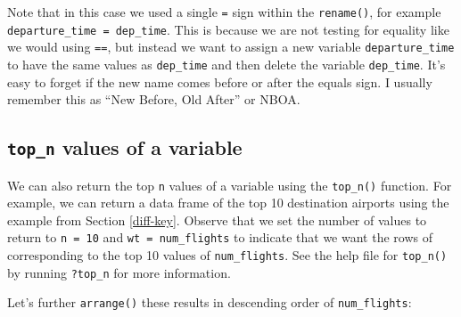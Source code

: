 \documentclass[12pt, krantz2,]{krantz}
\makeatletter
\newenvironment{Shaded}{\begin{snugshade}}{\end{snugshade}}
\newcommand{\DataTypeTok}[1]{\textcolor[rgb]{0.27,0.27,0.27}{#1}}
\newcommand{\DecValTok}[1]{\textcolor[rgb]{0.06,0.06,0.06}{#1}}
\newcommand{\KeywordTok}[1]{\textcolor[rgb]{0.27,0.27,0.27}{\textbf{#1}}}
\newcommand{\NormalTok}[1]{#1}
\newcommand{\OperatorTok}[1]{\textcolor[rgb]{0.43,0.43,0.43}{\textbf{#1}}}
\newcommand{\StringTok}[1]{\textcolor[rgb]{0.5,0.5,0.5}{#1}}
\newenvironment{kframe}{%
\medskip{}
\setlength{\fboxsep}{.8em}
 \def\at@end@of@kframe{}%
 \ifinner\ifhmode%
  \def\at@end@of@kframe{\end{minipage}}%
  \begin{minipage}{\columnwidth}%
 \fi\fi%
 \def\FrameCommand##1{\hskip\@totalleftmargin \hskip-\fboxsep
 \colorbox{shadecolor}{##1}\hskip-\fboxsep
     \hskip-\linewidth \hskip-\@totalleftmargin \hskip\columnwidth}%
 \MakeFramed {\advance\hsize-\width
   \@totalleftmargin\z@ \linewidth\hsize
   \@setminipage}}%
 {\par\unskip\endMakeFramed%
 \at@end@of@kframe}
\renewenvironment{Shaded}{\begin{kframe}}{\end{kframe}}
\makeatother
\begin{document}
Note that in this case we used a single \texttt{=} sign within the \texttt{rename()}, for example \texttt{departure\_time\ =\ dep\_time}. This is because we are not testing for equality like we would using \texttt{==}, but instead we want to assign a new variable \texttt{departure\_time} to have the same values as \texttt{dep\_time} and then delete the variable \texttt{dep\_time}. It's easy to forget if the new name comes before or after the equals sign. I usually remember this as ``New Before, Old After'' or NBOA.

\hypertarget{top_n-values-of-a-variable}{%
\subsection{\texorpdfstring{\texttt{top\_n} values of a variable}{top\_n values of a variable}}\label{top_n-values-of-a-variable}}

We can also return the top \texttt{n} values of a variable using the \texttt{top\_n()} function. For example, we can return a data frame of the top 10 destination airports using the example from Section \ref{diff-key}. Observe that we set the number of values to return to \texttt{n\ =\ 10} and \texttt{wt\ =\ num\_flights} to indicate that we want the rows of corresponding to the top 10 values of \texttt{num\_flights}. See the help file for \texttt{top\_n()} by running \texttt{?top\_n} for more information.

\begin{Shaded}
\end{Shaded}

Let's further \texttt{arrange()} these results in descending order of \texttt{num\_flights}:

\begin{Shaded}
\end{Shaded}
\end{document}
